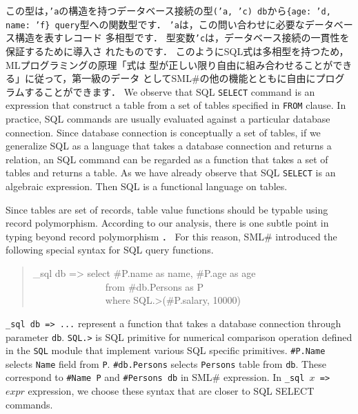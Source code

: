 \documentclass{jbook}
\newcommand{\smlsharp}{SML\#}
\newenvironment{program}{\begin{tt}\begin{quote}}{\end{quote}\end{tt}}
\newcommand{\myem}{\ \ \ \ \  }
\begin{document}
	この型は，{\tt 'a}の構造を持つデータベース接続の型{\tt  ('a, 'c)
db}から{\tt \{age: 'd, name: 'f\} query}型への関数型です．
	{\tt 'a}は，この問い合わせに必要なデータベース構造を表すレコード
多相型です．
	型変数{\tt 'c}は，データベース接続の一貫性を保証するために導入さ
れたものです．
	このようにSQL式は多相型を持つため，MLプログラミングの原理「式は
型が正しい限り自由に組み合わせることができる」に従って，第一級のデータ
として\smlsharp{}の他の機能とともに自由にプログラムすることができます．
\else%
	We observe that SQL {\tt SELECT} command is an expression that
construct a table from a set of tables specified in {\tt FROM} clause.
	In practice, SQL commands are usually evaluated against a
particular database connection.
	Since database connection is conceptually a set of tables, 
if we generalize SQL as a language that takes a database connection and
returns a relation, an SQL command can be regarded as a function that
takes a set of tables and returns a table.
	As we have already observe that SQL {\tt SELECT} is an algebraic
expression.
	Then SQL is a functional language on tables.

	Since tables are set of records, table value functions should be
typable using record polymorphism.
	According to our analysis, there is one subtle point in typing
beyond record polymorphism \cite{ohori11}．
	For this reason, \smlsharp{} introduced the following special
syntax for SQL query functions.
\begin{program}
\_sql db => select \#P.name as name, \#P.age as age\\
\myem\myem\myem from \#db.Persons as P\\
\myem\myem\myem where SQL.>(\#P.salary, 10000)
\end{program}
	{\tt \_sql db => ...} represent a function that takes a database
connection through parameter {\tt db}.
	{\tt SQL.>} is SQL primitive for numerical comparison operation
defined in the {\tt SQL} module that implement various SQL specific
primitives.
	{\tt \#P.Name} selects {\tt Name} field from {\tt P}.
{\tt \#db.Persons} selects {\tt Persons} table from {\tt db}.
	These correspond to {\tt \#Name P} and {\tt \#Persons db} in
\smlsharp{} expression.
	In {\tt \_sql $x$ => $expr$} expression, we choose these syntax
that are closer to SQL SELECT commands.
	
\end{document}
